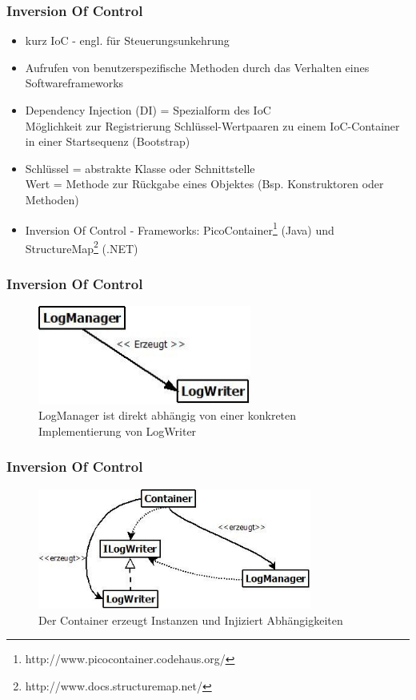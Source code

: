 \documentclass{beamer}
\begin{document}
\begin{frame}
\frametitle{Inversion Of Control}
\begin{itemize}
\item kurz IoC - engl. für Steuerungsunkehrung
\item Aufrufen von benutzerspezifische Methoden durch das Verhalten eines Softwareframeworks
\item Dependency Injection (DI) = Spezialform des IoC\\Möglichkeit zur Registrierung Schlüssel-Wertpaaren zu einem IoC-Container in einer Startsequenz (Bootstrap)
\item Schlüssel = abstrakte Klasse oder Schnittstelle\\Wert = Methode zur Rückgabe eines Objektes (Bsp. Konstruktoren oder Methoden)
\item Inversion Of Control - Frameworks:
PicoContainer\footnote{http://www.picocontainer.codehaus.org/} (Java) und StructureMap\footnote{http://www.docs.structuremap.net/} (.NET)
\end{itemize}
\end{frame}

\begin{frame}
\frametitle{Inversion Of Control}
\begin{figure}[htbp]
\includegraphics[width=7cm]{logging_closeCoupled.jpg}
\caption{LogManager ist direkt abhängig von einer konkreten Implementierung von LogWriter}
\end{figure}
\end{frame}

\begin{frame}
\frametitle{Inversion Of Control}
\begin{figure}[htbp]
\includegraphics[width=9cm]{logging_looseCoupled.jpg}
\caption{Der Container erzeugt Instanzen und Injiziert Abhängigkeiten}
\end{figure}
\end{frame}
\end{document}
